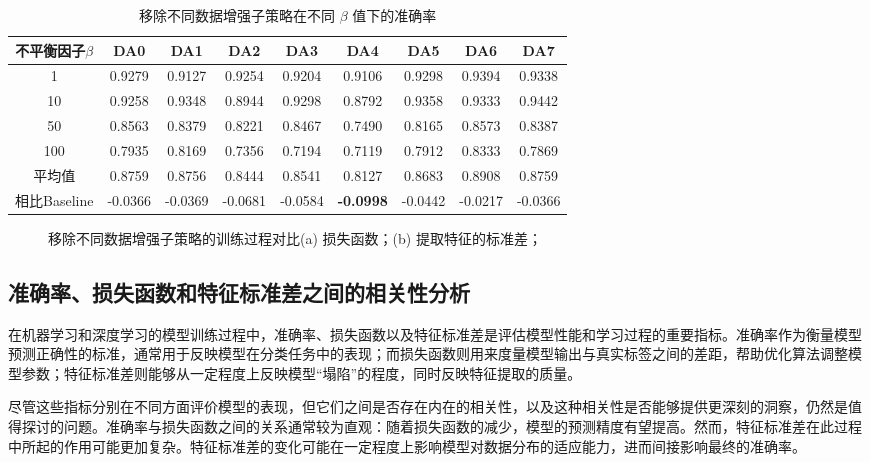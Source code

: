 \documentclass[master]{thesis-uestc}
\begin{document}
\begin{table}
    \caption{移除不同数据增强子策略在不同 $\beta$ 值下的准确率}
    \centering
    \begin{tabular}{ccccccccc}
    \toprule
    不平衡因子$\beta$  & DA0 & DA1 & DA2 & DA3 & DA4 & DA5 & DA6 & DA7 \\
    \midrule
    1   & 0.9279  & 0.9127 & 0.9254 & 0.9204 & 0.9106 & 0.9298 & 0.9394 & 0.9338  \\
    10  & 0.9258  & 0.9348 & 0.8944 & 0.9298 & 0.8792 & 0.9358 & 0.9333 & 0.9442  \\
    50  & 0.8563  & 0.8379 & 0.8221 & 0.8467 & 0.7490 & 0.8165 & 0.8573 & 0.8387  \\
    100 & 0.7935  & 0.8169 & 0.7356 & 0.7194 & 0.7119 & 0.7912 & 0.8333 & 0.7869  \\
    \midrule
    平均值 & 0.8759 & 0.8756 & 0.8444 & 0.8541 & 0.8127 & 0.8683 & 0.8908 & 0.8759 \\
    \midrule
    相比Baseline & -0.0366 & -0.0369 & -0.0681 & -0.0584 & \textbf{-0.0998} & -0.0442 & -0.0217 & -0.0366 \\
    \bottomrule
    \end{tabular}
    \label{tb:da_discuss_results}
\end{table}

\begin{figure}[h]
    \centering
    \caption{移除不同数据增强子策略的训练过程对比(a) 损失函数；(b) 提取特征的标准差；}
    \label{train_process_da_discuss}
\end{figure}

\subsection{准确率、损失函数和特征标准差之间的相关性分析}

在机器学习和深度学习的模型训练过程中，准确率、损失函数以及特征标准差是评估模型性能和学习过程的重要指标。准确率作为衡量模型预测正确性的标准，通常用于反映模型在分类任务中的表现；而损失函数则用来度量模型输出与真实标签之间的差距，帮助优化算法调整模型参数；特征标准差则能够从一定程度上反映模型“塌陷”的程度，同时反映特征提取的质量。

尽管这些指标分别在不同方面评价模型的表现，但它们之间是否存在内在的相关性，以及这种相关性是否能够提供更深刻的洞察，仍然是值得探讨的问题。准确率与损失函数之间的关系通常较为直观：随着损失函数的减少，模型的预测精度有望提高。然而，特征标准差在此过程中所起的作用可能更加复杂。特征标准差的变化可能在一定程度上影响模型对数据分布的适应能力，进而间接影响最终的准确率。
\end{document}
